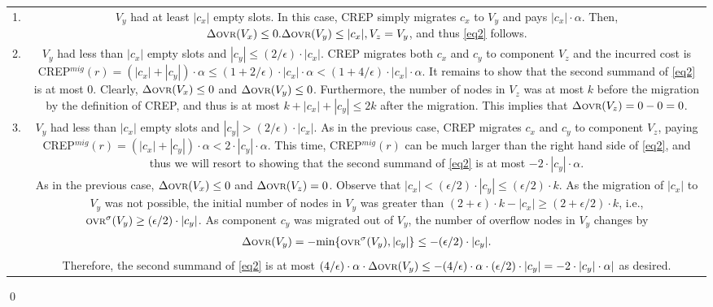 \documentclass[xcolor=dvipsnames, tikz, 12pt]{article}
\newcommand{\crep}{C{\scriptsize REP}}
\newcommand{\ovr}{\text{\scriptsize OVR}}
\theoremstyle{definition}
\begin{document}
\begin{tabularx}{\textwidth}{cC}
	1. &$V_y$ had at least $|c_x|$ empty slots. In this case, \crep{} simply migrates $c_x$ to $V_y$ and pays $|c_x|\cdot\alpha$. Then, $\Delta\ovr{}(V_x)\leq0. \Delta\ovr{}(V_y)\leq|c_x|, V_z=V_y$, and thus \ref{eq2} follows.\\
	
	2. &$V_y$ had less than $|c_x|$ empty slots and $|c_y|\leq(2/\epsilon)\cdot|c_x|$. \crep{} migrates both $c_x$ and $c_y$ to component $V_z$ and the incurred cost is \crep{}$^{mig}(r)=(|c_x|+|c_y|)\cdot\alpha\leq(1+2/\epsilon)\cdot|c_x|\cdot\alpha<(1+4/\epsilon)\cdot|c_x|\cdot\alpha$. It remains to show that the second summand of \ref{eq2} is at most 0. Clearly, $\Delta\ovr{}(V_x)\leq0$ and $\Delta\ovr{}(V_y)\leq0$. Furthermore, the number of nodes in $V_z$ was at most $k$ before the migration by the definition of \crep{}, and thus is at most $k+|c_x|+|c_y|\leq 2k$ after the migration. This implies that $\Delta\ovr{}(V_z)=0-0=0$.\\
	3. &$V_y$ had less than $|c_x|$ empty slots and $|c_y|>(2/\epsilon)\cdot|c_x|$. As in the previous case, \crep{} migrates $c_x$ and $c_y$ to component $V_z$, paying \crep{}$^{mig}(r)=(|c_x|+|c_y|)\cdot\alpha<2\cdot|c_y|\cdot\alpha$. This time, \crep{}$^{mig}(r)$ can be much larger than the right hand side of \ref{eq2}, and thus we will resort to showing that the second summand of \ref{eq2} is at most $-2\cdot|c_y|\cdot\alpha$.\\
	
	&As in the previous case, $\Delta\ovr{}(V_x)\leq0$ and $\Delta\ovr{}(V_z)=0$. Observe that $|c_x|<(\epsilon/2)\cdot|c_y|\leq(\epsilon/2)\cdot k$. As the migration of $|c_x|$ to $V_y$ was not possible, the initial number of nodes in $V_y$ was greater than $(2+\epsilon)\cdot k-|c_x|\geq(2+\epsilon/2)\cdot k$, i.e., $\ovr{}^\sigma(V_y)\geq(\epsilon/2)\cdot |c_y|$. As component $c_y$ was migrated out of $V_y$, the number of overflow nodes in $V_y$ changes by
	\begin{align*}
	\Delta\ovr{}(V_y)=-\text{min}\{\ovr{}^\sigma(V_y), |c_y|\}\leq-(\epsilon/2)\cdot|c_y|.
	\end{align*}
	Therefore, the second summand of \ref{eq2} is at most $(4/\epsilon)\cdot\alpha\cdot\Delta\ovr{}(V_y)\leq-(4/\epsilon)\cdot\alpha\cdot(\epsilon/2)\cdot|c_y|=-2\cdot|c_y|\cdot\alpha|$ as desired. \\
	\end{tabularx}\qed
\end{document}
